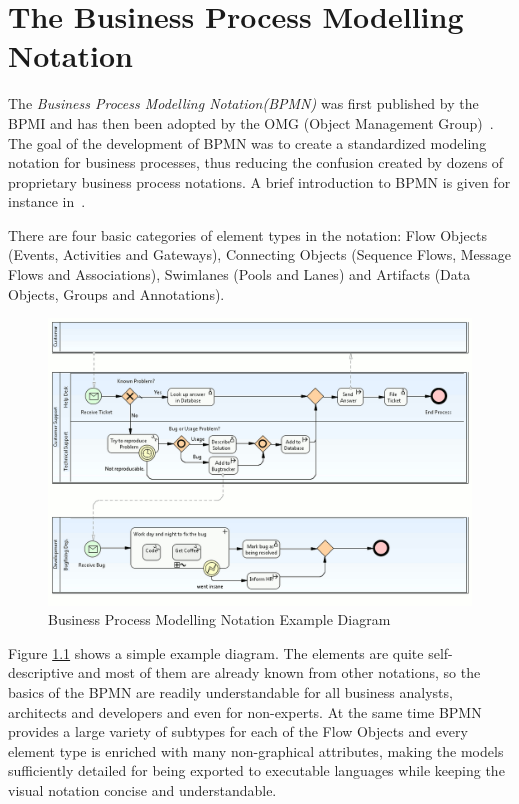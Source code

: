 \chapter{The Business Process Modelling Notation}
\label{sec:bpmn}


The \emph{Business Process Modelling Notation(BPMN)} was first published by the
BPMI and has then been adopted by the OMG (Object Management Group)~\cite{omg2011bpmn2}.
The goal of the development of BPMN was to create a standardized modeling notation
for business processes, thus reducing the confusion created by dozens of proprietary
business process notations.  A brief introduction to BPMN is given for instance
in~\cite{white2004introduction}.

There are four basic categories of element types in the notation: Flow Objects
(Events, Activities and Gateways), Connecting Objects (Sequence Flows, Message
Flows and Associations), Swimlanes (Pools and Lanes) and Artifacts (Data Objects,
Groups and Annotations).

\begin{figure}[ht]
	\centering
	\includegraphics[width=.8\textwidth]{figures/bpmn/example.png}
	\caption{Business Process Modelling Notation Example Diagram}
	\label{fig:bpmn_example}
\end{figure}

Figure \ref{fig:bpmn_example} shows a simple example diagram.  The elements are
quite self-descriptive and most of them are already known from other notations,
so the basics of the BPMN are readily understandable for all business analysts,
architects and developers and even for non-experts.  At the same time BPMN provides
a large variety of subtypes for each of the Flow Objects and every element type
is enriched with many non-graphical attributes, making the models sufficiently
detailed for being exported to executable languages while keeping the visual
notation concise and understandable.

